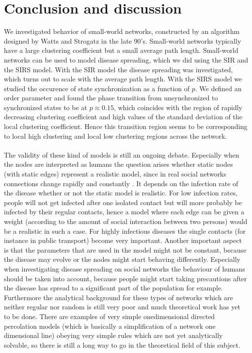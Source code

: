 \documentclass[10pt,a4paper]{article}
\begin{document}
\section{Conclusion and discussion}
We investigated behavior of small-world networks, constructed by an algorithm designed by Watts and Strogatz in the late 90's. Small-world networks typically have a large clustering coefficient but a small average path length. Small-world networks can be used to model disease spreading, which we did using the SIR and the SIRS model. With the SIR model the disease spreading was investigated, which turns out to scale with the average path length. With the SIRS model we studied the occurence of state synchronization as a function of $p$. We defined an order parameter and found the phase transition from unsynchronized to synchronized states to be at $p \approx 0.15$, which coincides with the region of rapidly decreasing clustering coefficient and high values of the standard deviation of the local clustering coefficient. Hence this transition region seems to be corresponding to local high clustering and local low clustering regions across the network.\\
\\
\noindent The validity of these kind of models is still an ongoing debate. Especially when the nodes are interpreted as humans the question arises whether static nodes (with static edges) represent a realistic model, since in real social networks connections change rapidly and constantly \cite{paper2}. It depends on the infection rate of the disease whether or not the static model is realistic. For low infection rates, people will not get infected after one isolated contact but will more probably be infected by their regular contacts, hence a model where each edge can be given a weight (according to the amount of social interaction between two persons) would be a realistic in such a case. For highly infectious diseases the single contacts (for instance in public transport) become very important.
Another important aspect is that the parameters that are used in the model might not be constant, because the disease may evolve or the nodes might start behaving differently. Especially when investigating disease spreading on social networks the behaviour of humans should be taken into account, because people might start taking precautions after the disease has spread to a significant part of the population for example.
Furthermore the analytical background for these types of networks which are neither regular nor random is still very poor and much theoretical work has yet to be done. There are examples of very simple onedimensional directed percolation models (which is basically a simplification of a network one dimensional line) obeying very simple rules which are not yet analytically solvable, so there is still a long way to go in the theoretical field of this subject.
\end{document}

